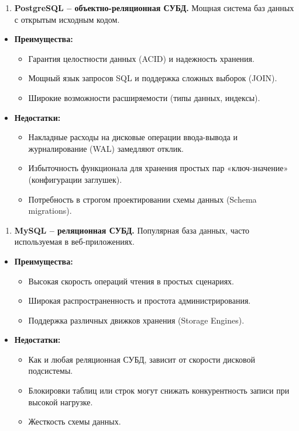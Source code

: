 \documentclass[
]{article}
\begin{document}
\begin{enumerate}
\def\labelenumi{\arabic{enumi}.}
\item
  \textbf{PostgreSQL -- объектно-реляционная СУБД.} Мощная система баз
  данных с открытым исходным кодом.
\end{enumerate}

\begin{itemize}
\item
  \textbf{Преимущества:}

  \begin{itemize}
  \item
    Гарантия целостности данных (ACID) и надежность хранения.
  \item
    Мощный язык запросов SQL и поддержка сложных выборок (JOIN).
  \item
    Широкие возможности расширяемости (типы данных, индексы).
  \end{itemize}
\item
  \textbf{Недостатки:}

  \begin{itemize}
  \item
    Накладные расходы на дисковые операции ввода-вывода и журналирование
    (WAL) замедляют отклик.
  \item
    Избыточность функционала для хранения простых пар «ключ-значение»
    (конфигурации заглушек).
  \item
    Потребность в строгом проектировании схемы данных (Schema
    migrations).
  \end{itemize}
\end{itemize}

\begin{enumerate}
\def\labelenumi{\arabic{enumi}.}
\setcounter{enumi}{1}
\item
  \textbf{MySQL -- реляционная СУБД.} Популярная база данных, часто
  используемая в веб-приложениях.
\end{enumerate}

\begin{itemize}
\item
  \textbf{Преимущества:}

  \begin{itemize}
  \item
    Высокая скорость операций чтения в простых сценариях.
  \item
    Широкая распространенность и простота администрирования.
  \item
    Поддержка различных движков хранения (Storage Engines).
  \end{itemize}
\item
  \textbf{Недостатки:}

  \begin{itemize}
  \item
    Как и любая реляционная СУБД, зависит от скорости дисковой
    подсистемы.
  \item
    Блокировки таблиц или строк могут снижать конкурентность записи при
    высокой нагрузке.
  \item
    Жесткость схемы данных.
  \end{itemize}
\end{itemize}
\end{document}
